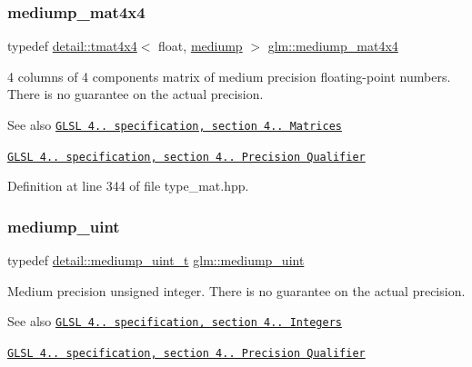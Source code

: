 \subsubsection{\texorpdfstring{mediump\+\_\+mat4x4}{mediump\_mat4x4}}
{\footnotesize\ttfamily typedef \hyperlink{structglm_1_1detail_1_1tmat4x4}{detail\+::tmat4x4}$<$ float, \hyperlink{namespaceglm_a0f04f086094c747d227af4425893f545a6416f3ea0c9025fb21ed50c4d6620482}{mediump} $>$ \hyperlink{group__core__precision_gacb51d2d10f7607617ac544f6db9a6eef}{glm\+::mediump\+\_\+mat4x4}}

4 columns of 4 components matrix of medium precision floating-\/point numbers. There is no guarantee on the actual precision.

\begin{DoxySeeAlso}{See also}
\href{http://www.opengl.org/registry/doc/GLSLangSpec.4.20.8.pdf}{\tt G\+L\+SL 4.. specification, section 4.. Matrices} 

\href{http://www.opengl.org/registry/doc/GLSLangSpec.4.20.8.pdf}{\tt G\+L\+SL 4.. specification, section 4.. Precision Qualifier} 
\end{DoxySeeAlso}


Definition at line 344 of file type\+\_\+mat.\+hpp.

\mbox{\label{group__core__precision_ga08ae38ad78ade3539fdd1d25052b8c51}} 
\subsubsection{\texorpdfstring{mediump\+\_\+uint}{mediump\_uint}}
{\footnotesize\ttfamily typedef \hyperlink{namespaceglm_1_1detail_a98f572e92099cc1b5740f1ccf1c80f8d}{detail\+::mediump\+\_\+uint\+\_\+t} \hyperlink{group__core__precision_ga08ae38ad78ade3539fdd1d25052b8c51}{glm\+::mediump\+\_\+uint}}

Medium precision unsigned integer. There is no guarantee on the actual precision.

\begin{DoxySeeAlso}{See also}
\href{http://www.opengl.org/registry/doc/GLSLangSpec.4.20.8.pdf}{\tt G\+L\+SL 4.. specification, section 4.. Integers} 

\href{http://www.opengl.org/registry/doc/GLSLangSpec.4.20.8.pdf}{\tt G\+L\+SL 4.. specification, section 4.. Precision Qualifier} 
\end{DoxySeeAlso}


